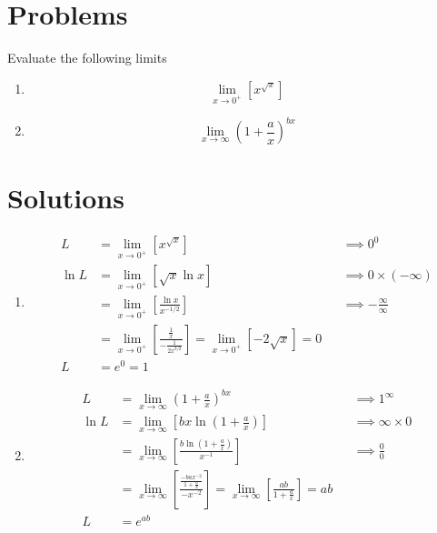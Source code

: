 \documentclass[12pt, A4]{report}
\begin{document}
		\section*{Problems}
			Evaluate the following limits
			\begin{enumerate}
				\item
					\[\lim_{x\to 0^+}\left[x^{\sqrt{x}}\right]\]
				\item
					\[\lim_{x\to\infty}\left(1 + \frac{a}{x}\right)^{bx}\]
			\end{enumerate}
			\newpage
		\section*{Solutions}
			\begin{enumerate}
				\item
					\begin{align*}
						L &= \lim_{x\to 0^+}\left[x^{\sqrt{x}}\right] 
							&&\implies 0^0 \\
						\ln L &= \lim_{x\to 0^+}\left[\sqrt{x}\ln x\right] 
							&&\implies 0 \times (-\infty) \\
						&= \lim_{x\to 0^+}\left[\frac{\ln x}{x^{-1/2}}\right] 
							&&\implies -\frac{\infty}{\infty} \\
						&= \lim_{x\to 0^+}\left[\frac{\frac{1}{x}}{-\frac{1}{2x^{3/2}}}\right] = \lim_{x\to 0^+}\left[-2\sqrt{x}\right] = 0 \\
						L &= e^0 = 1
					\end{align*}
				\item
					\begin{align*}
						L &= \lim_{x\to\infty}\left(1 + \frac{a}{x}\right)^{bx}
							&&\implies 1^{\infty} \\
						\ln L &= \lim_{x\to\infty}\left[bx\ln\left(1 + \frac{a}{x}\right)\right]
							&&\implies \infty \times 0 \\
						&= \lim_{x\to\infty}\left[\frac{b\ln\left(1 + \frac{a}{x}\right)}{x^{-1}}\right]
							&&\implies \frac{0}{0} \\
						&= \lim_{x\to\infty}\left[\frac{\frac{-bax^{-2}}{1 + \frac{a}{x}}}{-x^{-2}}\right] = \lim_{x\to\infty}\left[\frac{ab}{1 + \frac{a}{x}}\right] = ab \\
						L &= e^{ab}
					\end{align*}
			\end{enumerate}
\end{document}
